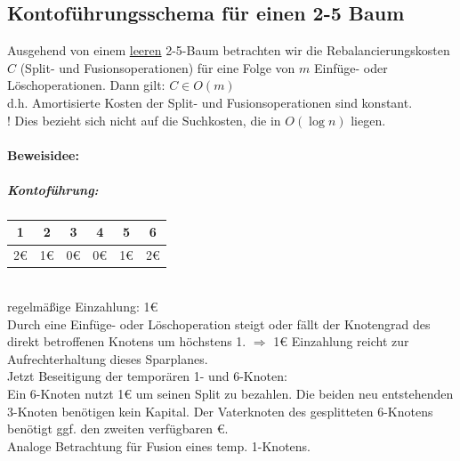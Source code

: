 \subsection{Kontoführungsschema für einen 2-5 Baum} %
\satz Ausgehend von einem \underline{leeren} 2-5-Baum betrachten wir die Rebalancierungskosten $C$ (Split- und Fusionsoperationen) für eine Folge von $m$ Einfüge- oder Löschoperationen. Dann gilt: $C\in O(m)$\\
d.h. Amortisierte Kosten der Split- und Fusionsoperationen sind konstant.\\
! Dies bezieht sich nicht auf die Suchkosten, die in $O(\log n)$ liegen.
\paragraph*{Beweisidee:}
\subparagraph*{Kontoführung:}
\begin{tabular}{|c|c|c|c|c|c|}
	\hline \rule[-2ex]{0pt}{5.5ex} 1 & 2 & 3 & 4 & 5 & 6 \\ 
	\hline \rule[-2ex]{0pt}{5.5ex} 2€ & 1€ & 0€ & 0€ & 1€ & 2€ \\ 
	\hline 
\end{tabular}
\vspace{5pt} \\
regelmäßige Einzahlung: 1€\\
Durch eine Einfüge- oder Löschoperation steigt oder fällt der Knotengrad des direkt betroffenen Knotens um höchstens 1. $\Rightarrow$ 1€ Einzahlung reicht zur Aufrechterhaltung dieses Sparplanes.\\
Jetzt Beseitigung der temporären 1- und 6-Knoten:\\
Ein 6-Knoten nutzt 1€ um seinen Split zu bezahlen. Die beiden neu entstehenden 3-Knoten benötigen kein Kapital. Der Vaterknoten des gesplitteten 6-Knotens benötigt ggf. den zweiten verfügbaren €.\\
Analoge Betrachtung für Fusion eines temp. 1-Knotens.
